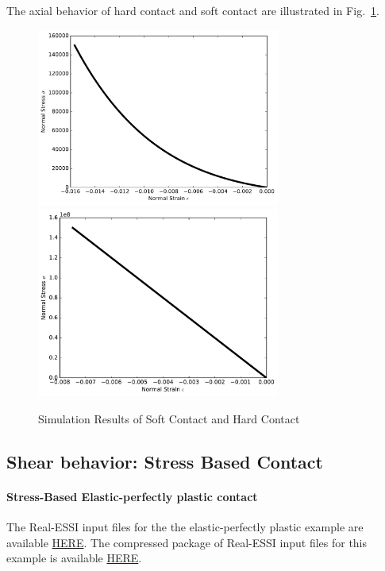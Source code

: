 The axial behavior of hard contact and soft contact are illustrated in Fig.~\ref{fig_soft_hard_contact}.



\begin{figure}[H]
  \centering
  \includegraphics[width = 8cm]{./Figure-files/Day3/Contact_Examples/softcontact.pdf}
  \includegraphics[width = 8cm]{./Figure-files/Day3/Contact_Examples/hardcontact.pdf}
  \caption{Simulation Results of Soft Contact and Hard Contact}
  \label{fig_soft_hard_contact}
\end{figure}






\clearpage
\newpage
\subsection{ Shear behavior: Stress Based Contact }


\paragraph{Stress-Based Elastic-perfectly plastic contact}
The Real-ESSI input files for the the elastic-perfectly plastic example are available 
\href{http://cml01.engr.ucdavis.edu/shortCourse/Day3/Contact_Examples/shear/SoftContact_Elastic_Perfectly_Plastic_Shear_Model}{HERE}. 
The compressed package of Real-ESSI input files for this example is available 
\href{http://cml01.engr.ucdavis.edu/shortCourse/Day3/Contact_Examples/shear/SoftContact_Elastic_Perfectly_Plastic_Shear_Model/SoftContact_Elastic_Perfectly_Plastic_Shear_Model.tgz}{HERE}. 



